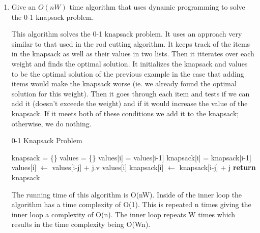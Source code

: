 \documentclass{article}
\begin{document}
\begin{enumerate}
    \item Give an $O(nW)$ time algorithm that uses dynamic programming to solve
        the 0-1 knapsack problem.
        
This algorithm solves the 0-1 knapsack problem. It uses an approach very similar to that used in the rod cutting algorithm. It keeps track of the items in the knapsack as well as their values in two lists. Then it itterates over each weight and finds the optimal solution. It initializes the knapsack and values to be the optimal solution of the previous example in the case that adding items would make the knapsack worse (ie. we already found the optimal solution for this weight). Then it goes through each item and tests if we can add it (doesn't exceede the weight) and if it would increase the value of the knapsack. If it meets both of these conditions we add it to the knapsack; otherwise, we do nothing.

        
\begin{algorithm}
    \caption{0-1 Knapsack Problem}\label{knap}
    \begin{algorithmic}[1]
      \State knapsack = \{\}
      \State values = \{\}
      	values[i] = values[i-1]
      	knapsack[i] = knapsack[i-1]
      			\State values[i] $\gets$ values[i-j] + j.v values[i]
      			\State knapsack[i] $\gets$ knapsack[i-j] + j
      		\EndIf
      	\EndFor
      \EndFor
      \State \textbf{return} knapsack
    \EndFunction
    \end{algorithmic}
\end{algorithm} 

The running time of this algorithm is O(nW). Inside of the inner loop the algorithm has a time complexity of O(1). This is repeated n times giving the inner loop a complexity of O(n). The inner loop repeats W times which results in the time complexity being O(Wn).

        
\end{enumerate}
\end{document}
